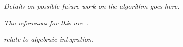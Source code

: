 \emph{Details on possible future work on the algorithm goes here.}

\emph{The references for this
are~\cite{adamchik1990hypergeometric,roach1997meijerg,
kauers2008integration,
davenport1984integration,bronstein1989simplification}.}

\emph{\cite{kauers2008integration,davenport1984integration} relate to
algebraic integration.}
